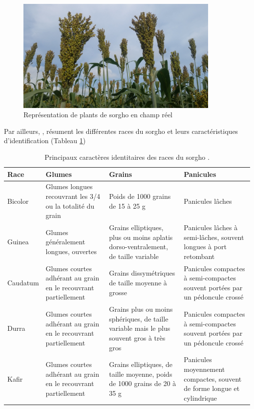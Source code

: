 \documentclass[a4paper,11pt]{article}
\begin{document}
\begin{figure}%
  \begin{center}
    \includegraphics[width=10cm]{images/PlantDeSorgho}
  \end{center}
\caption{Représentation de plants de sorgho en champ réel}
\end{figure}


Par ailleurs, , résument les différentes races du sorgho et
leurs caractéristiques d'identification (Tableau \ref{tableau:Chantereau_2013})

\begin{table}
\begin{center}
\begin{tabular}{lp{4cm}p{4cm}p{4cm}}
  Race  & Glumes  & Grains  & Panicules  \\ \hline
  Bicolor  & Glumes longues recouvrant les 3/4 ou la totalité du grain  & Poids de 1000 grains de 15 à 25 g  & Panicules lâches \\ \hline
  Guinea  & Glumes généralement longues, ouvertes & Grains elliptiques, plus ou moins aplatis dorso-ventralement, de taille variable & Panicules lâches à semi-lâches, souvent longues à port retombant \\ \hline
  Caudatum & Glumes courtes adhérant au grain en le recouvrant partiellement & Grains dissymétriques de taille moyenne à grosse & Panicules compactes à semi-compactes souvent portées par un pédoncule crossé \\ \hline
  Durra & Glumes courtes adhérant au grain en le recouvrant partiellement & Grains plus ou moins sphériques, de taille variable mais le plus souvent gros à très gros & Panicules compactes à semi-compactes souvent portées par un pédoncule crossé \\ \hline
  Kafir & Glumes courtes adhérant au grain en le recouvrant partiellement & Grains elliptiques, de taille moyenne, poids de 1000 grains de 20 à 35 g & Panicules moyennement compactes, souvent de forme longue et cylindrique \\ \hline
\end{tabular}
\caption{Principaux caractères identitaires des races du sorgho \protect\cite{Chantereau_2013}.}
\label{tableau:Chantereau_2013}
\end{center}
\end{table}
\end{document}
